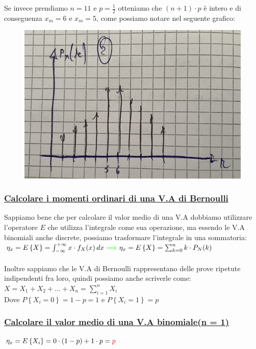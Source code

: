 \documentclass{article}
\begin{document}
Se invece prendiamo $n = 11$ e $p = \frac 12$ otteniamo che $(n+1)\cdot p$ è intero e di conseguenza $x_m = 6 $ e $x_m = 5$, come possiamo notare nel seguente grafico:
\begin{figure}[H]
\centering
\includegraphics[scale=0.10]{images/65.ModaBinDeltaInt.jpeg}
\end{figure}
\subsubsection{\underline{Calcolare i momenti ordinari di una V.A di Bernoulli}}
Sappiamo bene che per calcolare il valor medio di una V.A dobbiamo utilizzare l’operatore $E$ che utilizza l’integrale come sua operazione, ma essendo le V.A binomiali anche discrete, possiamo trasformare l’integrale in una sommatoria: \\
$\eta_x = E\left\{X\right\} =\int_{-\infty}^{+\infty} x \cdot f_X(x) \,dx
{\color{green} \implies}
\eta_x = E\left\{X\right\} =\sum_{k=0}^{n} k \cdot P_N(k)$ \\ \\
Inoltre sappiamo che le V.A di Bernoulli rappresentano delle prove ripetute indipendenti fra loro, quindi possiamo anche scriverle come: \\
$X = X_1 + X_2 + \dots +X_n = \sum_{i=1}^{n} X_i$ \\
Dove $P \left\{X_i=0\right\} = 1-p = 1$ e $P \left\{X_i = 1 \right\} = p$
\subsubsection{\underline{Calcolare il valor medio di una V.A binomiale(n = 1)}}
$\eta_x = E \left\{ X_i \right\} = 0 \cdot (1-p) + 1 \cdot p = \color{red}p$
\end{document}

